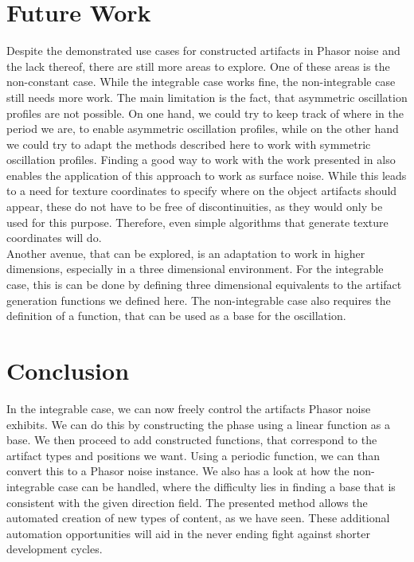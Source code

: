 \documentclass{utue} %
\begin{document}
\section{Future Work}
Despite the demonstrated use cases for constructed artifacts in Phasor noise and the lack thereof, there are still more areas to explore. One of these areas is the non-constant case. While the integrable case works fine, the non-integrable case still needs more work. The main limitation is the fact, that asymmetric oscillation profiles are not possible. On one hand, we could try to keep track of where in the period we are, to enable asymmetric oscillation profiles, while on the other hand we could try to adapt the methods described here to work with symmetric oscillation profiles. Finding a good way to work with the work presented in \cite{stripes} also enables the application of this approach to work as surface noise. While this leads to a need for texture coordinates to specify where on the object artifacts should appear, these do not have to be free of discontinuities, as they would only be used for this purpose. Therefore, even simple algorithms that generate texture coordinates will do.\\
Another avenue, that can be explored, is an adaptation to work in higher dimensions, especially in a three dimensional environment. For the integrable case, this is can be done by defining three dimensional equivalents to the artifact generation functions we defined here. The non-integrable case also requires the definition of a function, that can be used as a base for the oscillation.

\section{Conclusion}
In the integrable case, we can now freely control the artifacts Phasor noise exhibits. We can do this by constructing the phase using a linear function as a base. We then proceed to add constructed functions, that correspond to the artifact types and positions we want. Using a periodic function, we can than convert this to a Phasor noise instance. We also has a look at how the non-integrable case can be handled, where the difficulty lies in finding a base that is consistent with the given direction field. The presented method allows the automated creation of new types of content, as we have seen. These additional automation opportunities will aid in the never ending fight against shorter development cycles.


\FloatBarrier
\printbibliography
\end{document}
